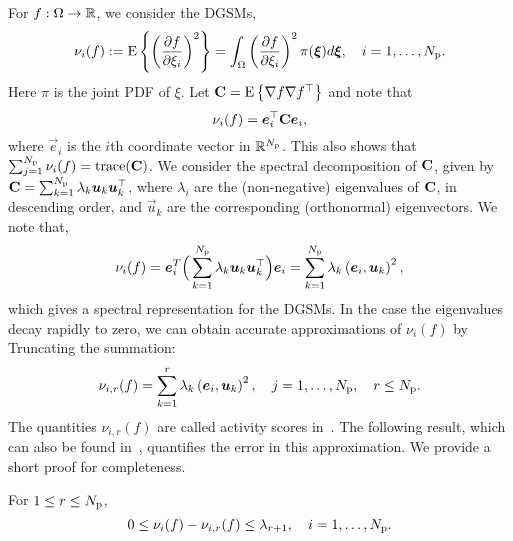 For $f: \Omega \to \mathbb{R}$, we consider the DGSMs,
\[
    \nu_i(f) := \E{\left(\frac{\partial f}{\partial\xi_i}\right)^2} =
                  \int_\Omega 
                  \left(\frac{\partial f}{\partial\xi_i}\right)^2
                  \pi(\vec{\xi})d\vec{\xi}, \quad i = 1, \ldots, \Np.   
\]
Here $\pi$ is the joint PDF of $\xi$. 
Let $\mathbf{{C}} = \mathrm{E}\left\{{\nabla f \nabla f^\top} \right\}$ and note that
\[
   \nu_i(f) = \vec{e}_i^\top \mat{C} \vec{e}_i, 
\]
where $\vec{e}_i$ is the $i$th coordinate vector in $\mathbb{R}^{N_\text{p}}$.
This also shows that $\sum_{j=1}^{N_\text{p}} \nu_i(f) = \mathrm{trace}(\mathbf{{C}})$.
We consider the spectral decomposition of $\mathbf{{C}}$, given by  
$\mat{C} = \sum_{k=1}^\Np \lambda_k \vec{u}_k \vec{u}_k^\top$, where 
$\lambda_i$ are the (non-negative) eigenvalues of $\mathbf{{C}}$, in descending
order, and
$\vec{u}_k$ are the corresponding (orthonormal) eigenvectors.
We note that,
\begin{equation}\label{equ:spectral_DGSM}
\nu_i(f) = \vec{e}_i^T \Big(\sum_{k=1}^\Np \lambda_k \vec{u}_k \vec{u}_k^\top\Big) \vec{e}_i
 = \sum_{k=1}^\Np \lambda_k \ip{\vec{e}_i}{\vec{u}_k}^2, 
\end{equation}
which gives a spectral representation for the DGSMs. 
In the case the eigenvalues decay rapidly to zero, we can obtain
accurate approximations of $\nu_i(f)$ by Truncating the summation: 
\newcommand{\act}[3]{\nu_{{#2},{#3}}({#1})}
\newcommand{\actt}[3]{\tilde{\nu}_{{#2},{#3}}({#1})}
\[
   \act{f}{i}{r} =  \sum_{k=1}^r \lambda_k \ip{\vec{e}_i}{\vec{u}_k}^2,
   \quad j = 1, \ldots, \Np, \quad r \leq \Np.
\]
The quantities $\act{f}{i}{r}$ are called activity scores
in~\cite{Diaz:2016,Constantine:2017}.
The following result, which
can also be found in~\cite{Diaz:2016,Constantine:2017}, quantifies the error in this
approximation. We provide a short proof for completeness. 
\begin{proposition}\label{prp:dgsm_bound} 
For $1 \leq r \leq {N_\text{p}}$,
\[
0 \leq \nu_i(f) - \act{f}{i}{r} \leq \lambda_{r+1}, \quad i = 1, \ldots, \Np.
\] 
\end{proposition}
